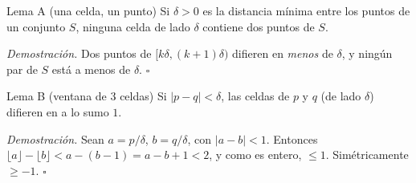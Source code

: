 \documentclass[11pt]{article}
\begin{document}
\begin{resultado}{Lema A (una celda, un punto)}
Si $\delta>0$ es la distancia mínima entre los puntos de un conjunto $S$, ninguna celda de lado $\delta$
contiene dos puntos de $S$.
\end{resultado}
\textit{Demostración.} Dos puntos de $[k\delta,(k+1)\delta)$ difieren en \emph{menos} de $\delta$, y ningún
par de $S$ está a menos de $\delta$. $\square$

\begin{resultado}{Lema B (ventana de 3 celdas)}
Si $|p-q|<\delta$, las celdas de $p$ y $q$ (de lado $\delta$) difieren en a lo sumo $1$.
\end{resultado}
\textit{Demostración.} Sean $a=p/\delta$, $b=q/\delta$, con $|a-b|<1$. Entonces
$\lfloor a\rfloor-\lfloor b\rfloor<a-(b-1)=a-b+1<2$, y como es entero, $\le1$. Simétricamente $\ge-1$. $\square$
\end{document}
